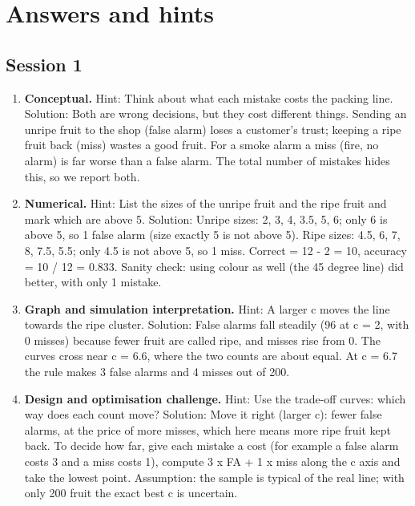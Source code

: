 \documentclass[11pt,a4paper]{article}
\begin{document}
\section{Answers and hints}

\subsection*{Session 1}
\begin{enumerate}[nosep]
\item \textbf{Conceptual.} Hint: Think about what each mistake costs the packing line. Solution: Both are wrong decisions, but they cost different things. Sending an unripe fruit to the shop (false alarm) loses a customer's trust; keeping a ripe fruit back (miss) wastes a good fruit. For a smoke alarm a miss (fire, no alarm) is far worse than a false alarm. The total number of mistakes hides this, so we report both.
\item \textbf{Numerical.} Hint: List the sizes of the unripe fruit and the ripe fruit and mark which are above 5. Solution: Unripe sizes: 2, 3, 4, 3.5, 5, 6; only 6 is above 5, so 1 false alarm (size exactly 5 is not above 5). Ripe sizes: 4.5, 6, 7, 8, 7.5, 5.5; only 4.5 is not above 5, so 1 miss. Correct = 12 - 2 = 10, accuracy = 10 / 12 = 0.833. Sanity check: using colour as well (the 45 degree line) did better, with only 1 mistake.
\item \textbf{Graph and simulation interpretation.} Hint: A larger c moves the line towards the ripe cluster. Solution: False alarms fall steadily (96 at c = 2, with 0 misses) because fewer fruit are called ripe, and misses rise from 0. The curves cross near c = 6.6, where the two counts are about equal. At c = 6.7 the rule makes 3 false alarms and 4 misses out of 200.
\item \textbf{Design and optimisation challenge.} Hint: Use the trade-off curves: which way does each count move? Solution: Move it right (larger c): fewer false alarms, at the price of more misses, which here means more ripe fruit kept back. To decide how far, give each mistake a cost (for example a false alarm costs 3 and a miss costs 1), compute 3 x FA + 1 x miss along the c axis and take the lowest point. Assumption: the sample is typical of the real line; with only 200 fruit the exact best c is uncertain.
\end{enumerate}
\end{document}

